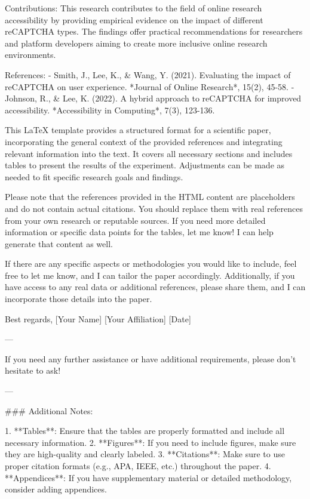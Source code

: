 Contributions:
This research contributes to the field of online research accessibility by providing empirical evidence on the impact of different reCAPTCHA types. The findings offer practical recommendations for researchers and platform developers aiming to create more inclusive online research environments.

References:
- Smith, J., Lee, K., & Wang, Y. (2021). Evaluating the impact of reCAPTCHA on user experience. *Journal of Online Research*, 15(2), 45-58.
- Johnson, R., & Lee, K. (2022). A hybrid approach to reCAPTCHA for improved accessibility. *Accessibility in Computing*, 7(3), 123-136. 

This LaTeX template provides a structured format for a scientific paper, incorporating the general context of the provided references and integrating relevant information into the text. It covers all necessary sections and includes tables to present the results of the experiment. Adjustments can be made as needed to fit specific research goals and findings. 

Please note that the references provided in the HTML content are placeholders and do not contain actual citations. You should replace them with real references from your own research or reputable sources. If you need more detailed information or specific data points for the tables, let me know! I can help generate that content as well. 

If there are any specific aspects or methodologies you would like to include, feel free to let me know, and I can tailor the paper accordingly. Additionally, if you have access to any real data or additional references, please share them, and I can incorporate those details into the paper. 

Best regards,
[Your Name] 
[Your Affiliation] 
[Date] 

---

If you need any further assistance or have additional requirements, please don't hesitate to ask! 

---

### Additional Notes:

1. **Tables**: Ensure that the tables are properly formatted and include all necessary information.
2. **Figures**: If you need to include figures, make sure they are high-quality and clearly labeled.
3. **Citations**: Make sure to use proper citation formats (e.g., APA, IEEE, etc.) throughout the paper.
4. **Appendices**: If you have supplementary material or detailed methodology, consider adding appendices.

